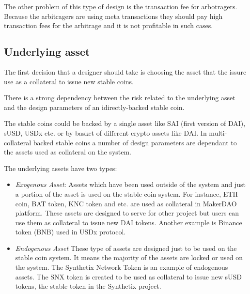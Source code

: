 The other problem of this type of design is the transaction fee for arbotragers. Because the arbitragers are using meta transactions they should pay high transaction fees for the arbitrage and it is not profitable in such cases.

\subsection{Underlying asset}
The first decision that a designer should take is choosing the asset that the issure use as a collateral to issue new stable coins.

There is a strong dependency between the risk related to the underlying asset and the design parameters of an idirectly-backed stable coin.

The stable coins could be backed by a single asset like SAI (first version of DAI), sUSD, USDx etc. or by basket of different crypto assets like DAI. In multi-collateral backed stable coins a number of design parameters are dependant to the assets used as collateral on the system.

The underlying assets have two types:

\begin{itemize}
	\item \emph{Exogenous Asset}: Assets which have been used outside of the system and just a portion of the asset is used on the stable coin system. For instance, ETH coin, BAT token, KNC token and etc. are used as collateral in MakerDAO platform. These assets are designed to serve for other project but users can use them as collateral to issue new DAI tokens.
	Another example is Binance token (BNB) used in USDx protocol. 
	\item \emph{Endogenous Asset} These type of assets are designed just to be used on the stable coin system. It means the majority of the assets are locked or used on the system. The Synthetix Network Token is an example of endogenous assets. The SNX token is created to be used as collateral to issue new sUSD tokens, the stable token in the Synthetix project.
\end{itemize}


